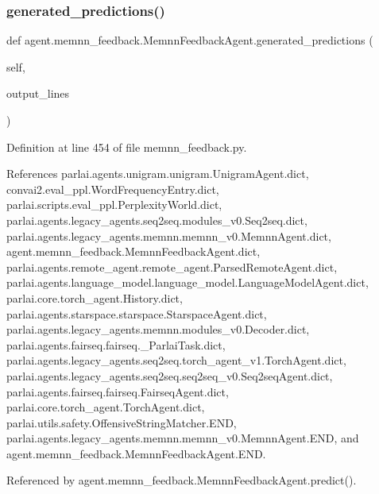\subsubsection{\texorpdfstring{generated\+\_\+predictions()}{generated\_predictions()}}
{\footnotesize\ttfamily def agent.\+memnn\+\_\+feedback.\+Memnn\+Feedback\+Agent.\+generated\+\_\+predictions (\begin{DoxyParamCaption}\item[{}]{self,  }\item[{}]{output\+\_\+lines }\end{DoxyParamCaption})}



Definition at line 454 of file memnn\+\_\+feedback.\+py.



References parlai.\+agents.\+unigram.\+unigram.\+Unigram\+Agent.\+dict, convai2.\+eval\+\_\+ppl.\+Word\+Frequency\+Entry.\+dict, parlai.\+scripts.\+eval\+\_\+ppl.\+Perplexity\+World.\+dict, parlai.\+agents.\+legacy\+\_\+agents.\+seq2seq.\+modules\+\_\+v0.\+Seq2seq.\+dict, parlai.\+agents.\+legacy\+\_\+agents.\+memnn.\+memnn\+\_\+v0.\+Memnn\+Agent.\+dict, agent.\+memnn\+\_\+feedback.\+Memnn\+Feedback\+Agent.\+dict, parlai.\+agents.\+remote\+\_\+agent.\+remote\+\_\+agent.\+Parsed\+Remote\+Agent.\+dict, parlai.\+agents.\+language\+\_\+model.\+language\+\_\+model.\+Language\+Model\+Agent.\+dict, parlai.\+core.\+torch\+\_\+agent.\+History.\+dict, parlai.\+agents.\+starspace.\+starspace.\+Starspace\+Agent.\+dict, parlai.\+agents.\+legacy\+\_\+agents.\+memnn.\+modules\+\_\+v0.\+Decoder.\+dict, parlai.\+agents.\+fairseq.\+fairseq.\+\_\+\+Parlai\+Task.\+dict, parlai.\+agents.\+legacy\+\_\+agents.\+seq2seq.\+torch\+\_\+agent\+\_\+v1.\+Torch\+Agent.\+dict, parlai.\+agents.\+legacy\+\_\+agents.\+seq2seq.\+seq2seq\+\_\+v0.\+Seq2seq\+Agent.\+dict, parlai.\+agents.\+fairseq.\+fairseq.\+Fairseq\+Agent.\+dict, parlai.\+core.\+torch\+\_\+agent.\+Torch\+Agent.\+dict, parlai.\+utils.\+safety.\+Offensive\+String\+Matcher.\+E\+ND, parlai.\+agents.\+legacy\+\_\+agents.\+memnn.\+memnn\+\_\+v0.\+Memnn\+Agent.\+E\+ND, and agent.\+memnn\+\_\+feedback.\+Memnn\+Feedback\+Agent.\+E\+ND.



Referenced by agent.\+memnn\+\_\+feedback.\+Memnn\+Feedback\+Agent.\+predict().

